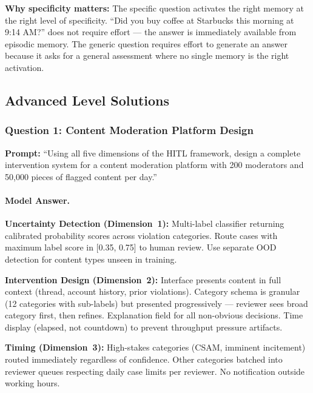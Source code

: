 \textbf{Why specificity matters:} The specific question activates the right memory at the right level of specificity. ``Did you buy coffee at Starbucks this morning at 9:14 AM?'' does not require effort --- the answer is immediately available from episodic memory. The generic question requires effort to generate an answer because it asks for a general assessment where no single memory is the right activation.

\subsection{Advanced Level Solutions}

\subsubsection{Question 1: Content Moderation Platform Design}

\textbf{Prompt:} ``Using all five dimensions of the HITL framework, design a complete intervention system for a content moderation platform with 200 moderators and 50,000 pieces of flagged content per day.''

\paragraph{Model Answer.}

\textbf{Uncertainty Detection (Dimension~1):}
Multi-label classifier returning calibrated probability scores across violation categories. Route cases with maximum label score in [0.35, 0.75] to human review. Use separate OOD detection for content types unseen in training.

\textbf{Intervention Design (Dimension~2):}
Interface presents content in full context (thread, account history, prior violations). Category schema is granular (12 categories with sub-labels) but presented progressively --- reviewer sees broad category first, then refines. Explanation field for all non-obvious decisions. Time display (elapsed, not countdown) to prevent throughput pressure artifacts.

\textbf{Timing (Dimension~3):}
High-stakes categories (CSAM, imminent incitement) routed immediately regardless of confidence. Other categories batched into reviewer queues respecting daily case limits per reviewer. No notification outside working hours.


